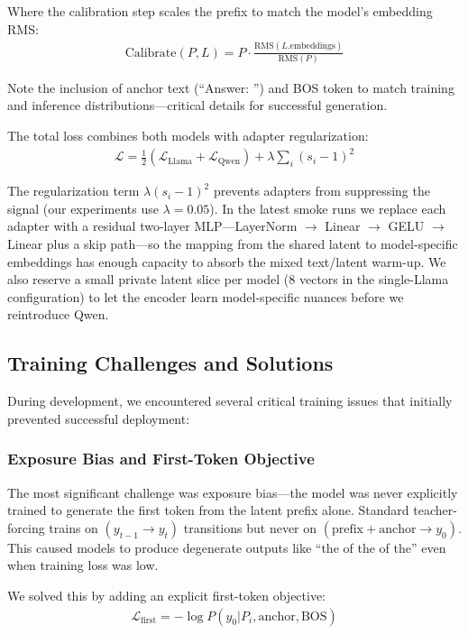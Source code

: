 \documentclass{article}
\begin{document}
Where the calibration step scales the prefix to match the model's embedding RMS:
\begin{align}
\text{Calibrate}(P, L) = P \cdot \frac{\text{RMS}(L.\text{embeddings})}{\text{RMS}(P)}
\end{align}

Note the inclusion of anchor text (``Answer: '') and BOS token to match training and inference distributions—critical details for successful generation.

The total loss combines both models with adapter regularization:
\begin{align}
\mathcal{L} = \frac{1}{2}(\mathcal{L}_{\text{Llama}} + \mathcal{L}_{\text{Qwen}}) + \lambda \sum_i (s_i - 1)^2
\end{align}

The regularization term $\lambda(s_i - 1)^2$ prevents adapters from suppressing the signal (our experiments use $\lambda=0.05$). In the latest smoke runs we replace each adapter with a residual two-layer MLP—LayerNorm $\rightarrow$ Linear $\rightarrow$ GELU $\rightarrow$ Linear plus a skip path—so the mapping from the shared latent to model-specific embeddings has enough capacity to absorb the mixed text/latent warm-up. We also reserve a small private latent slice per model (8 vectors in the single-Llama configuration) to let the encoder learn model-specific nuances before we reintroduce Qwen.

\subsection{Training Challenges and Solutions}

During development, we encountered several critical training issues that initially prevented successful deployment:

\subsubsection{Exposure Bias and First-Token Objective}

The most significant challenge was exposure bias—the model was never explicitly trained to generate the first token from the latent prefix alone. Standard teacher-forcing trains on $(y_{t-1} \rightarrow y_t)$ transitions but never on $(\text{prefix} + \text{anchor} \rightarrow y_0)$. This caused models to produce degenerate outputs like ``the of the of the'' even when training loss was low.

We solved this by adding an explicit first-token objective:
\begin{align}
\mathcal{L}_{\text{first}} = -\log P(y_0 | P_i, \text{anchor}, \text{BOS})
\end{align}
\end{document}
